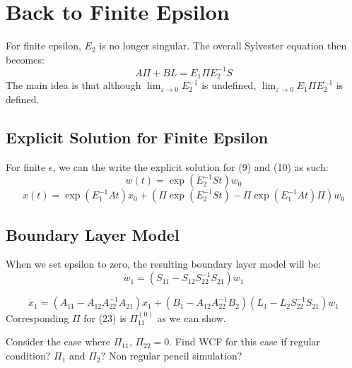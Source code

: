 \documentclass{article}
\begin{document}
\section{Back to Finite Epsilon}
For finite epsilon, $E_2$ is no longer singular. 
The overall Sylvester equation then becomes: 
\begin{equation}
    A \Pi + B L = E_1 \Pi E_2^{-1} S
\end{equation}
The main idea is that although $\lim_{\varepsilon \to 0} E_2^{-1}$ is undefined, 
$\lim_{\varepsilon \to 0} E_1 \Pi E_2^{-1}$ is defined. 
\subsection{Explicit Solution for Finite Epsilon}
For finite $\epsilon$, we can the write the explicit solution for (9) and (10) as such:
\begin{equation}
    w(t) = \exp({E_2^{-1} S t}) w_0
\end{equation}
\begin{equation}
    x(t) = \exp({E_1^{-1} A t}) x_0 + \left( \Pi \exp({E_2^{-1} S t}) - \Pi \exp({E_1^{-1} At}) \Pi \right) w_0
\end{equation}

\subsection{Boundary Layer Model}
When we set epsilon to zero, the resulting boundary layer model will be: 
\begin{equation}
    \dot{w}_1 = (S_{11} - S_{12} S_{22}^{-1} S_{21}) w_1
\end{equation}

\begin{equation}
    \dot{x}_1 = (A_{11}-A_{12} A_{22} ^{-1} A_{21}) x_1 + (B_1 - A_{12} A_{22}^{-1} B_2) (L_{1} - L_{2} S_{22} ^ {-1} S_{21}) w_1
\end{equation}
Corresponding $\Pi$ for (23) is $\Pi_{11}^{(0)}$ as we can show. 

Consider the case where $\Pi_{11}$, $\Pi_{22} = 0$. 
Find WCF for this case if regular condition?
$\Pi_1$ and $\Pi_2$?
Non regular pencil simulation? 





\end{document}
